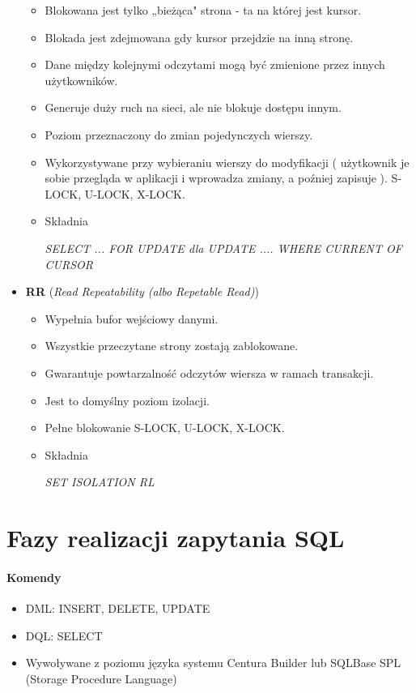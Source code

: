 \documentclass[a4paper,twoside]{article}
\begin{document}
\begin{itemize}
\begin{itemize}
  			\item Blokowana jest tylko „bieżąca" strona - ta na której jest kursor.
  			\item Blokada jest zdejmowana gdy kursor przejdzie na inną stronę.
  			\item Dane między kolejnymi odczytami mogą być zmienione przez innych użytkowników.               \item Generuje duży ruch na sieci, ale nie blokuje dostępu innym.
  			\item Poziom przeznaczony do zmian pojedynczych wierszy.
  			\item Wykorzystywane przy wybieraniu wierszy do modyfikacji ( użytkownik je sobie przegląda w aplikacji i wprowadza zmiany, a poźniej zapisuje ). S-LOCK, U-LOCK, X-LOCK.
  			\item Składnia\\
  			\centerline{\emph{SELECT ... FOR UPDATE dla UPDATE .... WHERE CURRENT OF CURSOR}}
  		\end{itemize}
  		\item \textbf{RR} (\emph{Read Repeatability (albo Repetable Read)})
  		\begin{itemize}
  			\item Wypełnia bufor wejściowy danymi.
  			\item Wszystkie przeczytane strony zostają zablokowane.
  			\item Gwarantuje powtarzalność odczytów wiersza w ramach transakcji.
  			\item Jest to domyślny poziom izolacji.
  			\item Pełne blokowanie S-LOCK, U-LOCK, X-LOCK.
  			\item Składnia\\
  			\centerline{\emph{SET ISOLATION RL}}
  		\end{itemize}
  	\end{itemize}
  	
  	
  	
  	
  	\part*{Fazy realizacji zapytania SQL}
  	\subsection*{Komendy}
  	\begin{itemize}
  		\item DML: INSERT, DELETE, UPDATE
  		\item DQL: SELECT
  		\item Wywoływane  z poziomu języka systemu Centura Builder lub SQLBase SPL (Storage Procedure Language)
  	\end{itemize}
\end{document}
